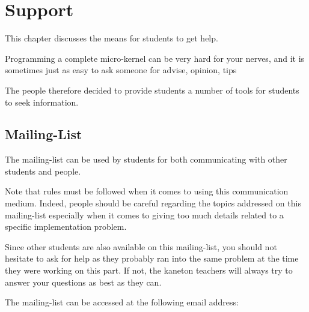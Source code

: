 %
%
%
%
%
%

%
%

\chapter{Support}
\label{chapter:support}

This chapter discusses the means for students to get help.

\newpage

%
%

Programming a complete micro-kernel can be very hard for your nerves, and
it is sometimes just as easy to ask someone for advise, opinion, tips \etc{}

The  people therefore decided to provide students a number of
tools for students to seek information.

%
%

\section{Mailing-List}

The mailing-list can be used by students for both communicating with
other students and  people.

Note that rules must be followed when it comes to using this communication
medium. Indeed, people should be careful regarding the topics addressed
on this mailing-list especially when it comes to giving too much details
related to a specific implementation problem.

Since other students are also available on this mailing-list, you should not
hesitate to ask for help as they probably ran into the same problem at the
time they were working on this part. If not, the kaneton teachers will always
try to answer your questions as best as they can.

The mailing-list can be accessed at the following email address:

\begin{center}
\end{center}

